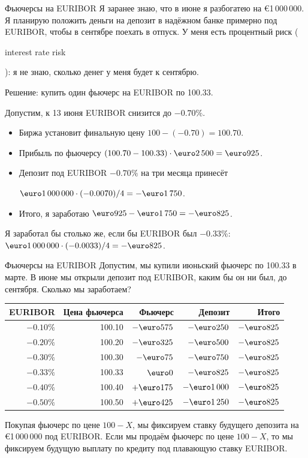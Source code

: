 \documentclass{beamer}
\renewcommand{\EUR}[1]{\textup{\euro}#1}
\newcommand{\en}[1]{\begin{otherlanguage}{english}#1\end{otherlanguage}}
\begin{document}
\begin{frame}{Фьючерсы на EURIBOR}
\justify
Я заранее знаю, что в июне я разбогатею на \EUR{1\,000\,000}. Я планирую положить деньги на депозит в надёжном банке примерно под EURIBOR, чтобы в сентябре поехать в отпуск. У меня есть \alert{процентный риск} (\en{interest rate risk}): я не знаю, сколько денег у меня будет к сентябрю.

\justify
Решение: купить один фьючерс на EURIBOR по 100.33.

\justify
Допустим, к 13 июня EURIBOR снизится до $-0.70\%$.
\begin{itemize}
\justifying
\item Биржа установит финальную цену $100 - (-0.70) = 100.70$.
\item Прибыль по фьючерсу $(100.70-100.33)\cdot\EUR{2\,500} = \EUR{925}$.
\item Депозит под EURIBOR $-0.70\%$ на три месяца принесёт

$\EUR{1\,000\,000} \cdot (-0.0070) / 4 = -\EUR{1\,750}$.
\item Итого, я заработаю $\EUR{925} - \EUR{1\,750} = -\EUR{825}$.
\end{itemize} 

\justify
Я заработал бы столько же, если бы EURIBOR был $-0.33\%$: $\EUR{1\,000\,000} \cdot (-0.0033)/4 =-\EUR{825}$.
\end{frame}



\begin{frame}{Фьючерсы на EURIBOR}
\justify
Допустим, мы купили июньский фьючерс по 100.33 в марте. В июне мы открыли депозит под
EURIBOR, каким бы он ни был, до сентября. Сколько мы заработаем?

\justify
\centering
\begin{tabular}{r|r|r|r|r}
EURIBOR   & Цена фьючерса & Фьючерс      & Депозит & Итого \\ \hline
$-0.10\%$ & 100.10        & $-\EUR{575}$ & $-\EUR{250}$    & $-\EUR{825}$ \\
$-0.20\%$ & 100.20        & $-\EUR{325}$ & $-\EUR{500}$ & $-\EUR{825}$ \\
$-0.30\%$ & 100.30        & $-\EUR{75}$ & $-\EUR{750}$ & $-\EUR{825}$ \\
$-0.33\%$ & 100.33        & $\EUR{0}$    & $-\EUR{825}$ & $-\EUR{825}$ \\
$-0.40\%$ & 100.40        & $+\EUR{175}$ & $-\EUR{1\,000}$ & $-\EUR{825}$ \\
$-0.50\%$ & 100.50        & $+\EUR{425}$ & $-\EUR{1\,250}$ & $-\EUR{825}$
\end{tabular}

\justify
Покупая фьючерс по цене $100-X$, мы фиксируем ставку будущего депозита на \EUR{1\,000\,000} под EURIBOR. Если мы продаём фьючерс по цене $100-X$, то мы фиксируем будущую выплату по кредиту под плавающую ставку EURIBOR.
\end{frame}
\end{document}
